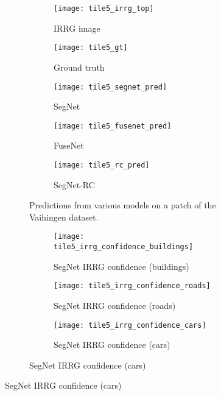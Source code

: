 \begin{figure}[!tb]
	\begin{subfigure}{\textwidth}
    	\captionsetup[subfigure]{singlelinecheck=off,justification=centering}
  		\captionsetup[subfigure]{labelformat=empty}
    	\begin{subfigure}{0.19\textwidth}
        	\texttt{[image: tile5\_irrg\_top]}
      		\caption*{IRRG image}
        \end{subfigure}
        \begin{subfigure}{0.19\textwidth}
        	\texttt{[image: tile5\_gt]}
        	\caption*{Ground truth}
        \end{subfigure}
        \begin{subfigure}{0.19\textwidth}
        	\texttt{[image: tile5\_segnet\_pred]}
        	\caption*{SegNet}
        \end{subfigure}
        \begin{subfigure}{0.19\textwidth}
        	\texttt{[image: tile5\_fusenet\_pred]}
        	\caption*{FuseNet}
        \end{subfigure}
        \begin{subfigure}{0.19\textwidth}
        	\texttt{[image: tile5\_rc\_pred]}
        	\caption*{SegNet-RC}
        \end{subfigure}
        \caption{Predictions from various models on a patch of the Vaihingen dataset.}
        \label{fig:fusion_exemple1}
    \end{subfigure}
    	\begin{subfigure}{\textwidth}
    	\captionsetup[subfigure]{singlelinecheck=off,justification=centering}
  		\captionsetup[subfigure]{labelformat=empty}
    	\begin{subfigure}{0.19\textwidth}
        	\texttt{[image: tile5\_irrg\_confidence\_buildings]}
      		\caption*{SegNet IRRG confidence (buildings)}
        \end{subfigure}
        \begin{subfigure}{0.19\textwidth}
        	\texttt{[image: tile5\_irrg\_confidence\_roads]}
        	\caption*{SegNet IRRG confidence (roads)}
        \end{subfigure}
        \begin{subfigure}{0.19\textwidth}
        	\texttt{[image: tile5\_irrg\_confidence\_cars]}
        	\caption*{SegNet IRRG confidence (cars)}
        \end{subfigure}

\end{subfigure}
\end{figure}
